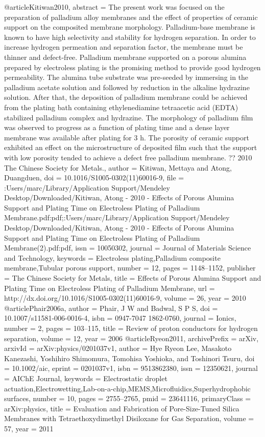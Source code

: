 @article{Kitiwan2010,
abstract = {The present work was focused on the preparation of palladium alloy membranes and the effect of properties of ceramic support on the composited membrane morphology. Palladium-base membrane is known to have high selectivity and stability for hydrogen separation. In order to increase hydrogen permeation and separation factor, the membrane must be thinner and defect-free. Palladium membrane supported on a porous alumina prepared by electroless plating is the promising method to provide good hydrogen permeability. The alumina tube substrate was pre-seeded by immersing in the palladium acetate solution and followed by reduction in the alkaline hydrazine solution. After that, the deposition of palladium membrane could be achieved from the plating bath containing ethylenediamine tetraacetic acid (EDTA) stabilized palladium complex and hydrazine. The morphology of palladium film was observed to progress as a function of plating time and a dense layer membrane was available after plating for 3 h. The porosity of ceramic support exhibited an effect on the microstructure of deposited film such that the support with low porosity tended to achieve a defect free palladium membrane. ?? 2010 The Chinese Society for Metals.},
author = {Kitiwan, Mettaya and Atong, Duangduen},
doi = {10.1016/S1005-0302(11)60016-9},
file = {:Users/marc/Library/Application Support/Mendeley Desktop/Downloaded/Kitiwan, Atong - 2010 - Effects of Porous Alumina Support and Plating Time on Electroless Plating of Palladium Membrane.pdf:pdf;:Users/marc/Library/Application Support/Mendeley Desktop/Downloaded/Kitiwan, Atong - 2010 - Effects of Porous Alumina Support and Plating Time on Electroless Plating of Palladium Membrane(2).pdf:pdf},
issn = {10050302},
journal = {Journal of Materials Science and Technology},
keywords = {Electroless plating,Palladium composite membrane,Tubular porous support},
number = {12},
pages = {1148--1152},
publisher = {The Chinese Society for Metals},
title = {{Effects of Porous Alumina Support and Plating Time on Electroless Plating of Palladium Membrane}},
url = {http://dx.doi.org/10.1016/S1005-0302(11)60016-9},
volume = {26},
year = {2010}
}
@article{Phair2006a,
author = {Phair, J W and Badwal, S P S},
doi = {10.1007/s11581-006-0016-4},
isbn = {0947-7047 1862-0760},
journal = {Ionics},
number = {2},
pages = {103--115},
title = {{Review of proton conductors for hydrogen separation}},
volume = {12},
year = {2006}
}
@article{Ryeon2011,
archivePrefix = {arXiv},
arxivId = {arXiv:physics/0201037v1},
author = {Hye Ryeon Lee, Masakoto Kanezashi, Yoshihiro Shimomura, Tomohisa Yoshioka, and Toshinori Tsuru},
doi = {10.1002/aic},
eprint = {0201037v1},
isbn = {9513862380},
issn = {12350621},
journal = {AIChE Journal},
keywords = {Electrostatic droplet actuation,Electrowetting,Lab-on-a-chip,MEMS,Microfluidics,Superhydrophobic surfaces},
number = {10},
pages = {2755--2765},
pmid = {23641116},
primaryClass = {arXiv:physics},
title = {{Evaluation and Fabrication of Pore-Size-Tuned Silica Membranes with Tetraethoxydimethyl Disiloxane for Gas Separation}},
volume = {57},
year = {2011}
}
